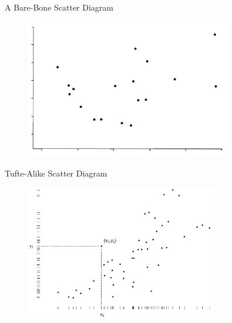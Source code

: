 \documentclass[aspectratio=1610]{beamer}
\begin{document}
\begin{frame}{A Bare-Bone Scatter Diagram}{}
	\begin{figure}
		\begin{center}
			\includegraphics[width=0.8\textwidth]{images/trad_scatter.png}
		\end{center}
	\end{figure}

\end{frame}

\begin{frame}{Tufte-Alike Scatter Diagram}{}
	\begin{figure}
		\begin{center}
			\includegraphics[width=0.75\textwidth]{images/tufte_scatter.png}
		\end{center}
	\end{figure}
\end{frame}
\end{document}
